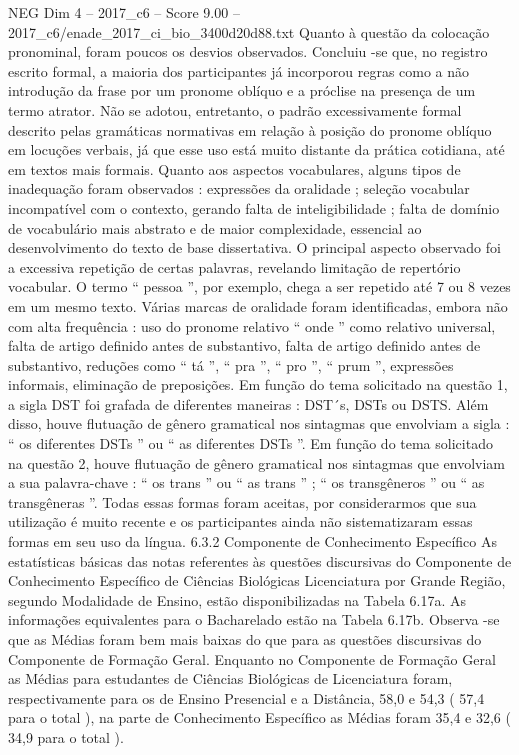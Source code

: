\begin{textsample}{NEG Dim 4 – 2017\_c6 – Score 9.00 – 2017\_c6/enade\_2017\_ci\_bio\_3400d20d88.txt}
Quanto à questão da colocação pronominal, foram poucos os desvios observados.
Concluiu -se que, no registro escrito formal, a maioria dos participantes já incorporou regras como a não introdução da frase por um pronome oblíquo e a próclise na presença de um termo atrator.
Não se adotou, entretanto, o padrão excessivamente formal descrito pelas gramáticas normativas em relação à posição do pronome oblíquo em locuções verbais, já que esse uso está muito distante da prática cotidiana, até em textos mais formais.
Quanto aos aspectos vocabulares, alguns tipos de inadequação foram observados : expressões da oralidade ; seleção vocabular incompatível com o contexto, gerando falta de inteligibilidade ; falta de domínio de vocabulário mais abstrato e de maior complexidade, essencial ao desenvolvimento do texto de base dissertativa.
O principal aspecto observado foi a excessiva repetição de certas palavras, revelando limitação de repertório vocabular.
O termo “ pessoa ”, por exemplo, chega a ser repetido até 7 ou 8 vezes em um mesmo texto.
Várias marcas de oralidade foram identificadas, embora não com alta frequência : uso do pronome relativo “ onde ” como relativo universal, falta de artigo definido antes de substantivo, falta de artigo definido antes de substantivo, reduções como “ tá ”, “ pra ”, “ pro ”, “ prum ”, expressões informais, eliminação de preposições.
Em função do tema solicitado na questão 1, a sigla DST foi grafada de diferentes maneiras : DST´s, DSTs ou DSTS.
Além disso, houve flutuação de gênero gramatical nos sintagmas que envolviam a sigla : “ os diferentes DSTs ” ou “ as diferentes DSTs ”.
Em função do tema solicitado na questão 2, houve flutuação de gênero gramatical nos sintagmas que envolviam a sua palavra-chave : “ os trans ” ou “ as trans ” ; “ os transgêneros ” ou “ as transgêneras ”.
Todas essas formas foram aceitas, por considerarmos que sua utilização é muito recente e os participantes ainda não sistematizaram essas formas em seu uso da língua. 6.3.2 Componente de Conhecimento Específico As estatísticas básicas das notas referentes às questões discursivas do Componente de Conhecimento Específico de Ciências Biológicas Licenciatura por Grande Região, segundo Modalidade de Ensino, estão disponibilizadas na Tabela 6.17a.
As informações equivalentes para o Bacharelado estão na Tabela 6.17b.
Observa -se que as Médias foram bem mais baixas do que para as questões discursivas do Componente de Formação Geral.
Enquanto no Componente de Formação Geral as Médias para estudantes de Ciências Biológicas de Licenciatura foram, respectivamente para os de Ensino Presencial e a Distância, 58,0 e 54,3 ( 57,4 para o total ), na parte de Conhecimento Específico as Médias foram 35,4 e 32,6 ( 34,9 para o total ).

\end{textsample}
